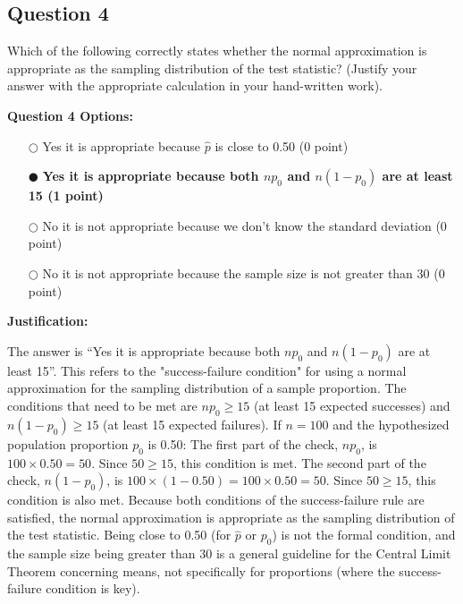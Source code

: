 \documentclass[12pt]{article}
\newcommand{\questionsep}{\vspace{1em}}
\begin{document}
\questionsep

\subsection*{Question 4 }
Which of the following correctly states whether the normal approximation is appropriate as the sampling distribution of the test statistic? (Justify your answer with the appropriate calculation in your hand-written work).

\medskip\noindent\textbf{Question 4 Options:}
\begin{itemize}[leftmargin=2em, labelsep=0.5em, itemsep=0.3em, topsep=0.3em]
    \item[$\bigcirc$] Yes it is appropriate because $\hat{p}$ is close to 0.50 (0 point)
    \item[$\mdlgblkcircle$] \textbf{Yes it is appropriate because both $np_0$ and $n(1-p_0)$ are at least 15 (1 point)}
    \item[$\bigcirc$] No it is not appropriate because we don’t know the standard deviation (0 point)
    \item[$\bigcirc$] No it is not appropriate because the sample size is not greater than 30 (0 point)
\end{itemize}

\medskip\noindent\textbf{Justification:}

The answer is “Yes it is appropriate because both $np_0$ and $n(1-p_0)$ are at least 15”. This refers to the "success-failure condition" for using a normal approximation for the sampling distribution of a sample proportion. The conditions that need to be met are $np_0 \geq 15$ (at least 15 expected successes) and $n(1-p_0) \geq 15$ (at least 15 expected failures). If $n = 100$ and the hypothesized population proportion $p_0$ is 0.50:
The first part of the check, $np_0$, is $100 \times 0.50 = 50$. Since $50 \geq 15$, this condition is met.
The second part of the check, $n(1-p_0)$, is $100 \times (1-0.50) = 100 \times 0.50 = 50$. Since $50 \geq 15$, this condition is also met.
Because both conditions of the success-failure rule are satisfied, the normal approximation is appropriate as the sampling distribution of the test statistic. Being close to 0.50 (for $\hat{p}$ or $p_0$) is not the formal condition, and the sample size being greater than 30 is a general guideline for the Central Limit Theorem concerning means, not specifically for proportions (where the success-failure condition is key).
\questionsep
\end{document}
